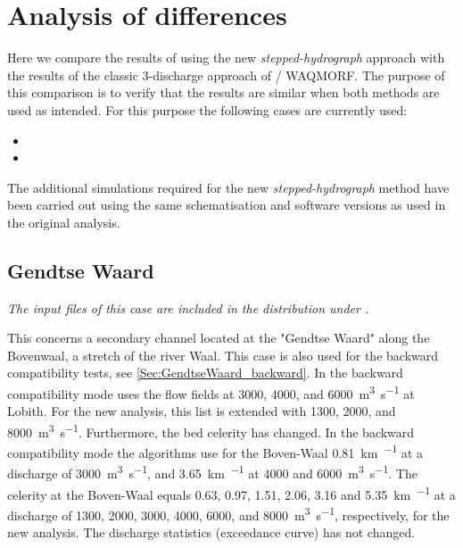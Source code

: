 \chapter{Analysis of differences} \label{Chp:Verschil}

Here we compare the results of \dfastmi using the new \emph{stepped-hydrograph} approach with the results of the classic 3-discharge approach of  / WAQMORF.
The purpose of this comparison is to verify that the results are similar when both methods are used as intended.
For this purpose the following cases are currently used:

\begin{itemize}
\item {}
\item {}
\end{itemize}

The additional simulations required for the new \emph{stepped-hydrograph} method have been carried out using the same schematisation and software versions as used in the original analysis.



\section{Gendtse Waard}\label{Sec:GendtseWaard}

\emph{The input files of this case are included in the distribution under .}

This concerns a secondary channel located at the "Gendtse Waard" along the Bovenwaal, a stretch of the river Waal.
This case is also used for the backward compatibility tests, see \autoref{Sec:GendtseWaard_backward}.
In the backward compatibility mode \dfmi uses the flow fields at 3000, 4000, and \SI{6000}{\metre\cubed\per\second} at Lobith.
For the new analysis, this list is extended with 1300, 2000, and \SI{8000}{\metre\cubed\per\second}.
Furthermore, the bed celerity has changed.
In the backward compatibility mode the algorithms use for the Boven-Waal \SI{0.81}{\kilo\metre\per\year} at a discharge of \SI{3000}{\metre\cubed\per\second}, and \SI{3.65}{\kilo\metre\per\year} at 4000 and \SI{6000}{\metre\cubed\per\second}.
The celerity at the Boven-Waal equals 0.63, 0.97, 1.51, 2.06, 3.16 and \SI{5.35}{\kilo\metre\per\year} at a discharge of 1300, 2000, 3000, 4000, 6000, and \SI{8000}{\metre\cubed\per\second}, respectively, for the new analysis.
The discharge statistics (exceedance curve) has not changed.


